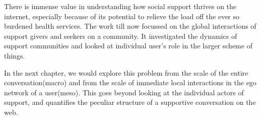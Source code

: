 There is immense value in understanding how social support thrives on the internet, especially because of its potential to relieve the load off the ever so burdened health services. 
The work till now focussed on the global interactions of support givers and seekers on a community. It investigated the dynamics of support communities and looked at individual user's role in the larger scheme of things. 

In the next chapter, we would explore this problem from the scale of the entire conversation(macro) and from the scale of immediate local interactions in the ego network of a user(meso). This goes beyond looking at the individual actors of support, and quantifies the peculiar structure of a supportive conversation on the web.